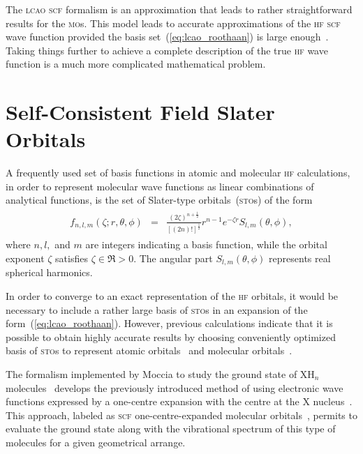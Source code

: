 The \textsc{lcao} \textsc{scf} formalism is an approximation that
leads to rather straightforward results for the \textsc{mo}s. This
model leads to accurate approximations of the \textsc{hf} \textsc{scf}
wave function provided the basis set~(\ref{eq:lcao_roothaan}) is large
enough~\cite{EllisonShullh2o_1955, Moccia_JCP_2164, Moccia_JCP_2176,
  Moccia_1964}. Taking things further to achieve a complete
description of the true \textsc{hf} wave function is a much more
complicated mathematical problem.


\section{Self-Consistent Field Slater Orbitals}
\label{ch:scf_sto}

A frequently used set of basis functions in atomic and molecular
\textsc{hf} calculations, in order to represent molecular wave
functions as linear combinations of analytical functions, is the set
of Slater-type orbitals~(\textsc{sto}s) of the form
%
\begin{eqnarray}
  \begin{split}
    f_{n,l,m}(\zeta;r,\theta,\phi) & = &
    \frac{(2\zeta)^{n + \frac{1}{2}}}{[(2n)!]^{\frac{1}{2}}} r^{n-1} e^{-\zeta r}
    S_{l,m}(\theta,\phi),
  \end{split}
  \label{eq:f_STO}
\end{eqnarray}
%
where $n,l,$ and $m$ are integers indicating a basis function, while
the orbital exponent $\zeta$ satisfies $\zeta \in \Re > 0 $. The
angular part $S_{l,m}(\theta,\phi)$ represents real spherical
harmonics.

In order to converge to an exact representation of the \textsc{hf}
orbitals, it would be necessary to include a rather large basis of
\textsc{sto}s in an expansion of the
form~(\ref{eq:lcao_roothaan}). However, previous calculations indicate
that it is possible to obtain highly accurate results by choosing
conveniently optimized basis of \textsc{sto}s to represent atomic
orbitals~\cite{Clementi_scfIon_1962,Clementi_STOatoms_1974,Bunge_STOtable_1993}
and molecular
orbitals~\cite{Moccia_JCP_2164,Moccia_JCP_2176,Moccia_1964}.

The formalism implemented by Moccia to study the ground state of
XH$_{n}$ molecules~\cite{Moccia_JCP_2164,Moccia_JCP_2176,Moccia_1964}
develops the previously introduced method of using electronic wave
functions expressed by a one-centre expansion with the centre at the X
nucleus~\cite{Parr_JCP_1960,oneCentre_1961}. This approach, labeled as
\textsc{scf} one-centre-expanded molecular
orbitals~\cite{Moccia_JCP_2164}, permits to evaluate the ground state
along with the vibrational spectrum of this type of molecules for a
given geometrical arrange.

